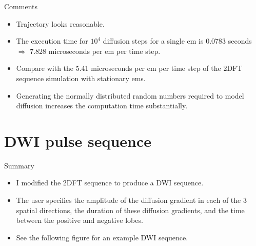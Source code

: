 \documentclass[dvipsnames]{beamer}
\begin{document}
\begin{frame}{Comments}
\begin{itemize}
\item Trajectory looks reasonable.
\item The execution time for $10^4$ diffusion steps for a single em is 0.0783 seconds $\Rightarrow$ 7.828 microseconds per em per time step.
\item Compare with the 5.41 microseconds per em per time step of the 2DFT sequence simulation with stationary ems.
\item Generating the normally distributed random numbers required to model diffusion increases the computation time substantially.
\end{itemize}
\end{frame}

\section{DWI pulse sequence}

\begin{frame}{Summary}
\begin{itemize}
\item I modified the 2DFT sequence to produce a DWI sequence.
\item The user specifies the amplitude of the diffusion gradient in each of the 3 spatial directions, the duration of these diffusion gradients, and the time between the positive and negative lobes.
\item See the following figure for an example DWI sequence.
\end{itemize}
\end{frame}
\end{document}
